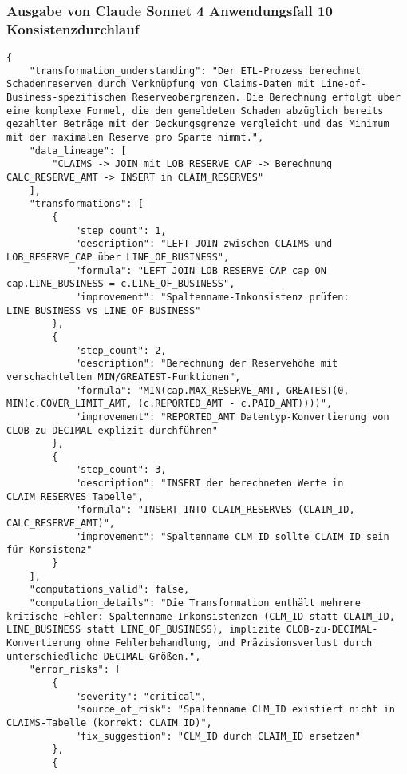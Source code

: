 \subsubsection{Ausgabe von Claude Sonnet 4 Anwendungsfall 10 Konsistenzdurchlauf}\label{anhang:subsubsec:claude_case10_prompt2}
\begin{lstlisting}[caption={Ausgabe: Claude Sonnet 4 Anwendungsfall 10 Konsistenzdurchlauf},label={claude_case10_prompt2}]
{
    "transformation_understanding": "Der ETL-Prozess berechnet Schadenreserven durch Verknüpfung von Claims-Daten mit Line-of-Business-spezifischen Reserveobergrenzen. Die Berechnung erfolgt über eine komplexe Formel, die den gemeldeten Schaden abzüglich bereits gezahlter Beträge mit der Deckungsgrenze vergleicht und das Minimum mit der maximalen Reserve pro Sparte nimmt.",
    "data_lineage": [
        "CLAIMS -> JOIN mit LOB_RESERVE_CAP -> Berechnung CALC_RESERVE_AMT -> INSERT in CLAIM_RESERVES"
    ],
    "transformations": [
        {
            "step_count": 1,
            "description": "LEFT JOIN zwischen CLAIMS und LOB_RESERVE_CAP über LINE_OF_BUSINESS",
            "formula": "LEFT JOIN LOB_RESERVE_CAP cap ON cap.LINE_BUSINESS = c.LINE_OF_BUSINESS",
            "improvement": "Spaltenname-Inkonsistenz prüfen: LINE_BUSINESS vs LINE_OF_BUSINESS"
        },
        {
            "step_count": 2,
            "description": "Berechnung der Reservehöhe mit verschachtelten MIN/GREATEST-Funktionen",
            "formula": "MIN(cap.MAX_RESERVE_AMT, GREATEST(0, MIN(c.COVER_LIMIT_AMT, (c.REPORTED_AMT - c.PAID_AMT))))",
            "improvement": "REPORTED_AMT Datentyp-Konvertierung von CLOB zu DECIMAL explizit durchführen"
        },
        {
            "step_count": 3,
            "description": "INSERT der berechneten Werte in CLAIM_RESERVES Tabelle",
            "formula": "INSERT INTO CLAIM_RESERVES (CLAIM_ID, CALC_RESERVE_AMT)",
            "improvement": "Spaltenname CLM_ID sollte CLAIM_ID sein für Konsistenz"
        }
    ],
    "computations_valid": false,
    "computation_details": "Die Transformation enthält mehrere kritische Fehler: Spaltenname-Inkonsistenzen (CLM_ID statt CLAIM_ID, LINE_BUSINESS statt LINE_OF_BUSINESS), implizite CLOB-zu-DECIMAL-Konvertierung ohne Fehlerbehandlung, und Präzisionsverlust durch unterschiedliche DECIMAL-Größen.",
    "error_risks": [
        {
            "severity": "critical",
            "source_of_risk": "Spaltenname CLM_ID existiert nicht in CLAIMS-Tabelle (korrekt: CLAIM_ID)",
            "fix_suggestion": "CLM_ID durch CLAIM_ID ersetzen"
        },
        {

\end{lstlisting}
